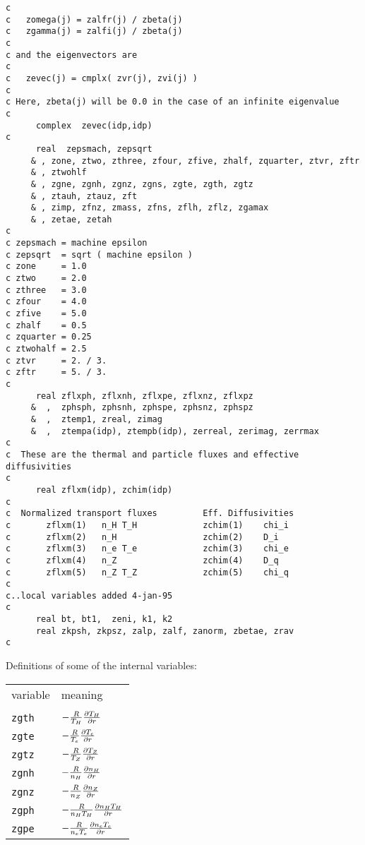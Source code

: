 \begin{verbatim}
c
c   zomega(j) = zalfr(j) / zbeta(j)
c   zgamma(j) = zalfi(j) / zbeta(j)
c
c and the eigenvectors are
c
c   zevec(j) = cmplx( zvr(j), zvi(j) )
c
c Here, zbeta(j) will be 0.0 in the case of an infinite eigenvalue
c
      complex  zevec(idp,idp)
c
      real  zepsmach, zepsqrt
     & , zone, ztwo, zthree, zfour, zfive, zhalf, zquarter, ztvr, zftr
     & , ztwohlf
     & , zgne, zgnh, zgnz, zgns, zgte, zgth, zgtz
     & , ztauh, ztauz, zft
     & , zimp, zfnz, zmass, zfns, zflh, zflz, zgamax
     & , zetae, zetah
c
c zepsmach = machine epsilon
c zepsqrt  = sqrt ( machine epsilon )
c zone     = 1.0
c ztwo     = 2.0
c zthree   = 3.0
c zfour    = 4.0
c zfive    = 5.0
c zhalf    = 0.5
c zquarter = 0.25
c ztwohalf = 2.5
c ztvr     = 2. / 3.
c zftr     = 5. / 3.
c
      real zflxph, zflxnh, zflxpe, zflxnz, zflxpz
     &  ,  zphsph, zphsnh, zphspe, zphsnz, zphspz
     &  ,  ztemp1, zreal, zimag
     &  ,  ztempa(idp), ztempb(idp), zerreal, zerimag, zerrmax
c
c  These are the thermal and particle fluxes and effective diffusivities
c
      real zflxm(idp), zchim(idp)
c
c  Normalized transport fluxes         Eff. Diffusivities
c       zflxm(1)   n_H T_H             zchim(1)    chi_i                
c       zflxm(2)   n_H                 zchim(2)    D_i
c       zflxm(3)   n_e T_e             zchim(3)    chi_e
c       zflxm(4)   n_Z                 zchim(4)    D_q
c       zflxm(5)   n_Z T_Z             zchim(5)    chi_q
c
c..local variables added 4-jan-95
c
      real bt, bt1,  zeni, k1, k2
      real zkpsh, zkpsz, zalp, zalf, zanorm, zbetae, zrav
c
\end{verbatim}

Definitions of some of the internal variables:

\renewcommand{\arraystretch}{1.4}
\begin{center}
\begin{tabular}{lp{4.0in}}
variable & meaning \\
\\
{\tt zgth} & $ - \frac{R}{T_H} \frac{\partial T_H}{\partial r} $ \\
{\tt zgte} & $ - \frac{R}{T_e} \frac{\partial T_e}{\partial r} $ \\
{\tt zgtz} & $ - \frac{R}{T_Z} \frac{\partial T_Z}{\partial r} $ \\
{\tt zgnh} & $ - \frac{R}{n_H} \frac{\partial n_H}{\partial r} $ \\
{\tt zgnz} & $ - \frac{R}{n_Z} \frac{\partial n_Z}{\partial r} $ \\
{\tt zgph} & $ - \frac{R}{n_H T_H} \frac{\partial n_H T_H}{\partial r} $ \\
{\tt zgpe} & $ - \frac{R}{n_e T_e} \frac{\partial n_e T_e}{\partial r} $ \\
\end{tabular}  \end{center}

